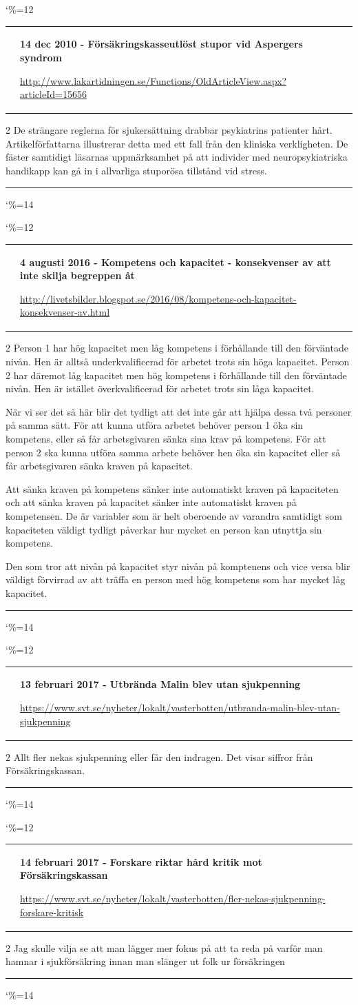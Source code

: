 \documentclass[a4paper]{article}
\makeatletter
\newcommand{\entry}{
\catcode`\%=12
\@entry}
\newcommand{\@entry}[4][]{
\bigskip
\begin{tabular*}{\textwidth}{l m{\textwidth-4cm}}
\qrcode{#4} & \textbf{#2}

\medskip

\url{#4}

\end{tabular*}

\medskip


\begin{multicols}{2}
#3
\end{multicols}

#1

\medskip
\hrule

\catcode`\%=14
}
\makeatother
\begin{document}
\entry{14 dec 2010 - Försäkringskasseutlöst stupor vid Aspergers syndrom}{De strängare reglerna för sjukersättning drabbar psykiatrins patienter hårt. Artikelförfattarna illustrerar detta med ett fall från den kliniska verkligheten. De fäster samtidigt läsarnas uppmärksamhet på att individer med neuropsykiatriska handikapp kan gå in i allvarliga stuporösa tillstånd vid stress.}{http://www.lakartidningen.se/Functions/OldArticleView.aspx?articleId=15656}

\entry{4 augusti 2016 - Kompetens och kapacitet - konsekvenser av att inte skilja begreppen åt}{Person 1 har hög kapacitet men låg kompetens i förhållande till den förväntade nivån. Hen är alltså underkvalificerad för arbetet trots sin höga kapacitet. Person 2 har däremot låg kapacitet men hög kompetens i förhållande till den förväntade nivån. Hen är istället överkvalificerad för arbetet trots sin låga kapacitet.

När vi ser det så här blir det tydligt att det inte går att hjälpa dessa två personer på samma sätt. För att kunna utföra arbetet behöver person 1 öka sin kompetens, eller så får arbetsgivaren sänka sina krav på kompetens. För att person 2 ska kunna utföra samma arbete behöver hen öka sin kapacitet eller så får arbetsgivaren sänka kraven på kapacitet.

Att sänka kraven på kompetens sänker inte automatiskt kraven på kapaciteten och att sänka kraven på kapacitet sänker inte automatiskt kraven på kompetensen. De är variabler som är helt oberoende av varandra samtidigt som kapaciteten väldigt tydligt påverkar hur mycket en person kan utnyttja sin kompetens.

Den som tror att nivån på kapacitet styr nivån på komptenens och vice versa blir väldigt förvirrad av att träffa en person med hög kompetens som har mycket låg kapacitet.}{http://livetsbilder.blogspot.se/2016/08/kompetens-och-kapacitet-konsekvenser-av.html}


\entry{13 februari 2017 - Utbrända Malin blev utan sjukpenning}{Allt fler nekas sjukpenning eller får den indragen. Det visar siffror från Försäkringskassan.}{https://www.svt.se/nyheter/lokalt/vasterbotten/utbranda-malin-blev-utan-sjukpenning}

\entry{14 februari 2017 - Forskare riktar hård kritik mot Försäkringskassan}{Jag skulle vilja se att man lägger mer fokus på att ta reda på varför man hamnar i sjukförsäkring innan man slänger ut folk ur försäkringen}{https://www.svt.se/nyheter/lokalt/vasterbotten/fler-nekas-sjukpenning-forskare-kritisk}
\end{document}
